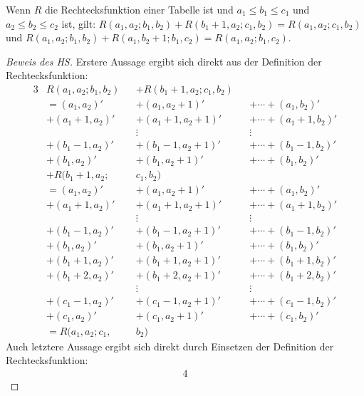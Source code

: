 \begin{lem}\label{r_summe}
    Wenn $R$ die Rechtecksfunktion einer Tabelle ist und $a_1\leq b_1\leq c_1$ und $a_2\leq b_2\leq c_2$ ist, gilt: 
    $R(a_1, a_2; b_1, b_2)+R(b_1+1, a_2; c_1, b_2)=R(a_1, a_2; c_1, b_2)$ und 
    $R(a_1, a_2; b_1, b_2)+R(a_1, b_2+1; b_1, c_2)=R(a_1, a_2; b_1, c_2)$.
\end{lem}
\begin{proof}[Beweis des HS]
    Erstere Aussage ergibt sich direkt aus der Definition der Rechtecksfunktion:
    \begin{alignat*}{3}
        &R(a_1, a_2; b_1, b_2)&& +R(b_1+1, a_2; c_1, b_2)&&\\
        &=(a_1, a_2)' &&+ (a_1, a_2+1)' &&+\cdots+ (a_1, b_2)'\\
        &+(a_1+1, a_2)' &&+ (a_1+1, a_2+1)' &&+\cdots+ (a_1+1, b_2)'\\
        & &&\vdots\quad\quad\quad\quad&&\vdots\\
        &+(b_1-1, a_2)' &&+ (b_1-1, a_2+1)' &&+\cdots + (b_1-1, b_2)'\\
        &+(b_1, a_2)' &&+ (b_1, a_2+1)' &&+ \cdots + (b_1, b_2)'\\
        &+R(b_1+1, a_2; &&c_1, b_2) &&\\
        &=(a_1, a_2)' &&+ (a_1, a_2+1)' &&+\cdots+ (a_1, b_2)'\\
        &+(a_1+1, a_2)' &&+ (a_1+1, a_2+1)' &&+\cdots+ (a_1+1, b_2)'\\
        & &&\vdots\quad\quad\quad\quad&&\vdots\\
        &+(b_1-1, a_2)' &&+ (b_1-1, a_2+1)' &&+\cdots + (b_1-1, b_2)'\\
        &+(b_1, a_2)' &&+ (b_1, a_2+1)' &&+ \cdots + (b_1, b_2)'\\
        &+(b_1+1, a_2)' &&+ (b_1+1, a_2+1)' &&+\cdots+ (b_1+1, b_2)'\\
        &+(b_1+2, a_2)' &&+ (b_1+2, a_2+1)' &&+\cdots+ (b_1+2, b_2)'\\
        & &&\vdots\quad\quad\quad\quad&&\vdots\\
        &+(c_1-1, a_2)' &&+ (c_1-1, a_2+1)' &&+\cdots + (c_1-1, b_2)'\\
        &+(c_1, a_2)' &&+ (c_1, a_2+1)' &&+ \cdots + (c_1, b_2)'\\
        &=R(a_1, a_2; c_1, &&b_2)&&
    \end{alignat*}
    Auch letztere Aussage ergibt sich direkt durch Einsetzen der Definition der Rechtecksfunktion:
    \begin{alignat*}{4}

\end{alignat*}
\end{proof}
